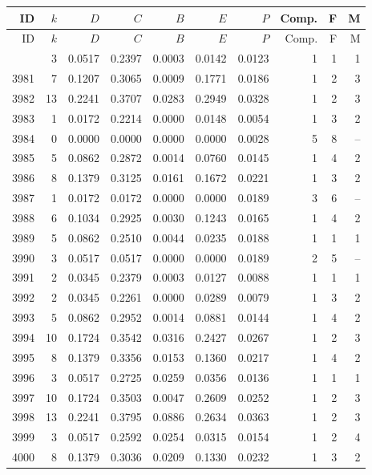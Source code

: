 \begin{longtable}{rrrrrrrrrr}
\toprule
ID & $k$ & $D$ & $C$ & $B$ & $E$ & $P$ & Comp. & F & M \\
\midrule
\endfirsthead
\toprule
ID & $k$ & $D$ & $C$ & $B$ & $E$ & $P$ & Comp. & F & M \\
\midrule
\endhead
\bottomrule
\endfoot
594 & 3 & 0.0517 & 0.2397 & 0.0003 & 0.0142 & 0.0123 & 1 & 1 & 1 \\
3981 & 7 & 0.1207 & 0.3065 & 0.0009 & 0.1771 & 0.0186 & 1 & 2 & 3 \\
3982 & 13 & 0.2241 & 0.3707 & 0.0283 & 0.2949 & 0.0328 & 1 & 2 & 3 \\
3983 & 1 & 0.0172 & 0.2214 & 0.0000 & 0.0148 & 0.0054 & 1 & 3 & 2 \\
3984 & 0 & 0.0000 & 0.0000 & 0.0000 & 0.0000 & 0.0028 & 5 & 8 & -- \\
3985 & 5 & 0.0862 & 0.2872 & 0.0014 & 0.0760 & 0.0145 & 1 & 4 & 2 \\
3986 & 8 & 0.1379 & 0.3125 & 0.0161 & 0.1672 & 0.0221 & 1 & 3 & 2 \\
3987 & 1 & 0.0172 & 0.0172 & 0.0000 & 0.0000 & 0.0189 & 3 & 6 & -- \\
3988 & 6 & 0.1034 & 0.2925 & 0.0030 & 0.1243 & 0.0165 & 1 & 4 & 2 \\
3989 & 5 & 0.0862 & 0.2510 & 0.0044 & 0.0235 & 0.0188 & 1 & 1 & 1 \\
3990 & 3 & 0.0517 & 0.0517 & 0.0000 & 0.0000 & 0.0189 & 2 & 5 & -- \\
3991 & 2 & 0.0345 & 0.2379 & 0.0003 & 0.0127 & 0.0088 & 1 & 1 & 1 \\
3992 & 2 & 0.0345 & 0.2261 & 0.0000 & 0.0289 & 0.0079 & 1 & 3 & 2 \\
3993 & 5 & 0.0862 & 0.2952 & 0.0014 & 0.0881 & 0.0144 & 1 & 4 & 2 \\
3994 & 10 & 0.1724 & 0.3542 & 0.0316 & 0.2427 & 0.0267 & 1 & 2 & 3 \\
3995 & 8 & 0.1379 & 0.3356 & 0.0153 & 0.1360 & 0.0217 & 1 & 4 & 2 \\
3996 & 3 & 0.0517 & 0.2725 & 0.0259 & 0.0356 & 0.0136 & 1 & 1 & 1 \\
3997 & 10 & 0.1724 & 0.3503 & 0.0047 & 0.2609 & 0.0252 & 1 & 2 & 3 \\
3998 & 13 & 0.2241 & 0.3795 & 0.0886 & 0.2634 & 0.0363 & 1 & 2 & 3 \\
3999 & 3 & 0.0517 & 0.2592 & 0.0254 & 0.0315 & 0.0154 & 1 & 2 & 4 \\
4000 & 8 & 0.1379 & 0.3036 & 0.0209 & 0.1330 & 0.0232 & 1 & 3 & 2 \\

\end{longtable}
